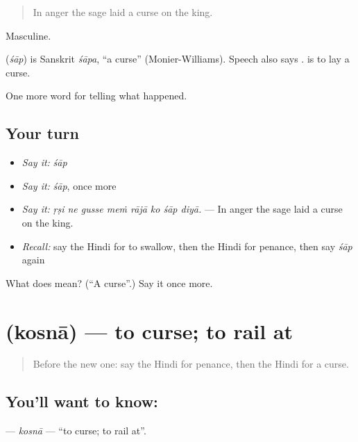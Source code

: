 \begin{quote}
In anger the sage laid a curse on the king.
\end{quote}

Masculine.

\begin{cousinweb}
\textbf{} (\emph{śāp}) is Sanskrit \emph{śāpa}, \textquotedblleft{}a curse\textquotedblright{} (Monier-Williams). Speech also says \textbf{}. \textbf{ } is to lay a curse.
\end{cousinweb}

\begin{grammarlens}[title={What you've built}]
One more word for telling what happened.
\end{grammarlens}

\subsection*{Your turn}
\begin{itemize}
\raggedright
  \item \emph{Say it:} \emph{śāp}
  \item \emph{Say it:} \emph{śāp}, once more
  \item \emph{Say it:} \emph{ṛṣi ne gusse meṁ rājā ko śāp diyā.} — In anger the sage laid a curse on the king.
  \item \emph{Recall:} say the Hindi for to swallow, then the Hindi for penance, then say \emph{śāp} again
\end{itemize}

\begin{tcolorbox}[breakable,colback=teal!4,colframe=teal!35!black,title={Before you move on}]
What does  mean? (\textquotedblleft{}A curse\textquotedblright{}.) Say it once more.
\end{tcolorbox}
\section[\texorpdfstring{\hi{कोसना} (kosnā)}{कोसना (kosnā)}]{ (kosnā) — to curse; to rail at}

\label{lesson:HI-C336-kosna}



\begin{quote}
Before the new one: say the Hindi for penance, then the Hindi for a curse.
\end{quote}

\subsection*{You'll want to know: }
\textbf{} — \emph{kosnā} — \textquotedblleft{}to curse; to rail at\textquotedblright{}.

